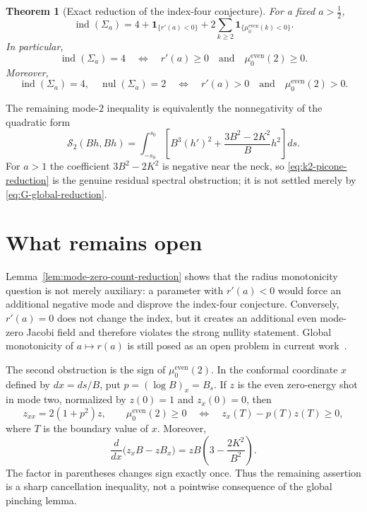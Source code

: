 \documentclass[11pt]{article}
\newtheorem{theorem}{Theorem}[section]
\begin{document}
\begin{theorem}[Exact reduction of the index-four conjecture]
For a fixed $a>\frac12$,
\begin{equation}\label{eq:exact-index-formula-reduction}
 \operatorname{ind}(\Sigma_a)
 =4+\mathbf 1_{\{r'(a)<0\}}
  +2\sum_{k\ge2}
       \mathbf 1_{\{\mu_0^{\mathrm{even}}(k)<0\}}.
\end{equation}
In particular,
\begin{equation}\label{eq:weak-equivalence-reduction}
 \operatorname{ind}(\Sigma_a)=4
 \quad\Longleftrightarrow\quad
 r'(a)\ge0\quad\text{and}\quad
 \mu_0^{\mathrm{even}}(2)\ge0.
\end{equation}
Moreover,
\begin{equation}\label{eq:strong-equivalence-reduction}
 \operatorname{ind}(\Sigma_a)=4,
 \quad\operatorname{nul}(\Sigma_a)=2
 \quad\Longleftrightarrow\quad
 r'(a)>0\quad\text{and}\quad
 \mu_0^{\mathrm{even}}(2)>0.
\end{equation}
\end{theorem}

The remaining mode-$2$ inequality is equivalently the nonnegativity of
the quadratic form
\begin{equation}\label{eq:k2-picone-reduction}
 \mathcal S_2(Bh,Bh)
 =\int_{-s_0}^{s_0}
 \left[B^3(h')^2+\frac{3B^2-2K^2}{B}h^2\right]ds.
\end{equation}
For $a>1$ the coefficient $3B^2-2K^2$ is negative near the neck, so
\eqref{eq:k2-picone-reduction} is the genuine residual spectral
obstruction; it is not settled merely by \eqref{eq:G-global-reduction}.

\section{What remains open}

Lemma~\ref{lem:mode-zero-count-reduction} shows that the radius
monotonicity question is not merely auxiliary: a parameter with
$r'(a)<0$ would force an additional negative mode and disprove the
index-four conjecture.  Conversely, $r'(a)=0$ does not change the
index, but it creates an additional even mode-zero Jacobi field and
therefore violates the strong nullity statement.  Global monotonicity
of $a\mapsto r(a)$ is still posed as an open problem in current
work~\cite{PigazziniDegenerate}.

The second obstruction is the sign of
$\mu_0^{\mathrm{even}}(2)$.  In the conformal coordinate $x$ defined
by $dx=ds/B$, put $p=(\log B)_x=B_s$.  If $z$ is the even zero-energy
shot in mode two, normalized by $z(0)=1$ and $z_x(0)=0$, then
\[
 z_{xx}=2(1+p^2)z,
 \qquad
 \mu_0^{\mathrm{even}}(2)\geq0
 \quad\Longleftrightarrow\quad
 z_x(T)-p(T)z(T)\geq0,
\]
where $T$ is the boundary value of $x$.  Moreover,
\[
 \frac{d}{dx}\bigl(z_xB-zB_x\bigr)
 =zB\left(3-\frac{2K^2}{B^2}\right).
\]
The factor in parentheses changes sign exactly once.  Thus the
remaining assertion is a sharp cancellation inequality, not a
pointwise consequence of the global pinching lemma.
\end{document}
